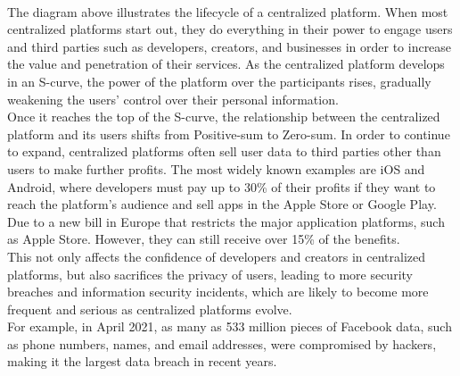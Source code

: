 \\
The diagram above illustrates the lifecycle of a centralized platform\cite{b35}. When most 
centralized platforms start out, they do everything in their power to engage users 
and third parties such as developers, creators, and businesses in order to increase 
the value and penetration of their services. As the centralized platform develops in 
an S-curve, the power of the platform over the participants rises, gradually weakening 
the users' control over their personal information\cite{b34}.
\\
Once it reaches the top of the S-curve, the relationship between the centralized 
platform and its users shifts from Positive-sum to Zero-sum\cite{b35, b17, b18}. In order to continue 
to expand, centralized platforms often sell user data to third parties other than 
users to make further profits. The most widely known examples are iOS and Android\cite{b34}, 
where developers must pay up to 30\% of their profits if they want to reach the 
platform's audience and sell apps in the Apple Store or Google Play\cite{b33}.
Due to a new bill in Europe that restricts the major application platforms, such as Apple Store.
However, they can still receive over 15\% of the benefits\cite{b39}.
\\
This not only affects the confidence of developers and creators in centralized platforms, 
but also sacrifices the privacy of users, leading to more security breaches and 
information security incidents, which are likely to become more frequent and serious 
as centralized platforms evolve\cite{b34}.
\\
For example, in April 2021, as many as 533 million pieces of Facebook data, 
such as phone numbers, names, and email addresses, were compromised by hackers, making 
it the largest data breach in recent years\cite{b32}.